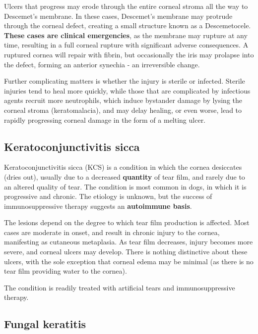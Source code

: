 \documentclass[openany]{article}
\begin{document}
Ulcers that progress may erode through the entire corneal stroma all the
way to Descemet's membrane. In these cases, Descemet's membrane may
protrude through the corneal defect, creating a small structure known as
a Descemetocele. \textbf{These cases are clinical emergencies}, as the
membrane may rupture at any time, resulting in a full corneal rupture
with significant adverse consequences. A ruptured cornea will repair
with fibrin, but occasionally the iris may prolapse into the defect,
forming an anterior synechia - an irreversible change.

Further complicating matters is whether the injury is sterile or
infected. Sterile injuries tend to heal more quickly, while those that
are complicated by infectious agents recruit more neutrophils, which
induce bystander damage by lysing the corneal stroma (keratomalacia),
and may delay healing, or even worse, lead to rapidly progressing
corneal damage in the form of a melting ulcer.

\subsection{Keratoconjunctivitis
sicca}\label{keratoconjunctivitis-sicca}

Keratoconjunctivitis sicca (KCS) is a condition in which the cornea
desiccates (dries out), usually due to a decreased \textbf{quantity} of
tear film, and rarely due to an altered quality of tear. The condition
is most common in dogs, in which it is progressive and chronic. The
etiology is unknown, but the success of immunosuppressive therapy
suggests an \textbf{autoimmune basis}.

The lesions depend on the degree to which tear film production is
affected. Most cases are moderate in onset, and result in chronic injury
to the cornea, manifesting as cutaneous metaplasia. As tear film
decreases, injury becomes more severe, and corneal ulcers may develop.
There is nothing distinctive about these ulcers, with the sole exception
that corneal edema may be minimal (as there is no tear film providing
water to the cornea).

The condition is readily treated with artificial tears and
immunosuppressive therapy.

\subsection{Fungal keratitis}\label{fungal-keratitis}
\end{document}
